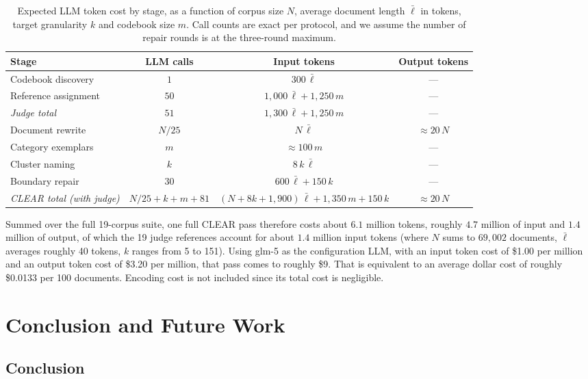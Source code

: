 \documentclass[11pt,a4paper,oneside]{report}
\begin{document}
\begin{table}[htbp]
\centering
\small
\begin{tabular}{lccc}
\toprule
Stage & LLM calls & Input tokens & Output tokens \\
\midrule
Codebook discovery & $1$ & $300\,\bar{\ell}$ & --- \\
Reference assignment & $50$ & $1{,}000\,\bar{\ell} + 1{,}250\,m$ & --- \\
\emph{Judge total} & $51$ & $1{,}300\,\bar{\ell} + 1{,}250\,m$ & --- \\
\midrule
Document rewrite & $N/25$ & $N\,\bar{\ell}$ & $\approx 20\,N$ \\
Category exemplars & $m$ & $\approx 100\,m$ & --- \\
Cluster naming & $k$ & $8\,k\,\bar{\ell}$ & --- \\
Boundary repair & $30$ & $600\,\bar{\ell} + 150\,k$ & --- \\
\emph{CLEAR total (with judge)} & $N/25 + k + m + 81$ & $(N + 8k + 1{,}900)\,\bar{\ell} + 1{,}350\,m + 150\,k$ & $\approx 20\,N$ \\
\bottomrule
\end{tabular}
\caption[Expected token cost by stage]{Expected LLM token cost by stage, as a function of corpus size $N$, average document length $\bar{\ell}$ in tokens, target granularity $k$ and codebook size $m$. Call counts are exact per protocol, and we assume the number of repair rounds is at the three-round maximum.}
\label{tab:cost}
\end{table}

Summed over the full 19-corpus suite, one full CLEAR pass therefore costs about $6.1$ million tokens, roughly $4.7$ million of input and $1.4$ million of output, of which the 19 judge references account for about $1.4$ million input tokens (where $N$ sums to $69{,}002$ documents, $\bar{\ell}$ averages roughly 40 tokens, $k$ ranges from 5 to 151). Using {\small\ttfamily glm-5} as the configuration LLM, with an input token cost of \$1.00 per million and an output token cost of \$3.20 per million, that pass comes to roughly \$9. That is equivalent to an average dollar cost of roughly \$0.0133 per 100 documents. Encoding cost is not included since its total cost is negligible.


\FloatBarrier
\chapter{Conclusion and Future Work}
\section{Conclusion}\label{sec:conclusion}
\end{document}
